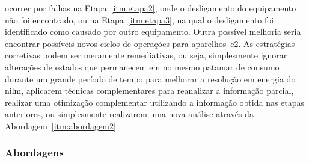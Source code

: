 \begin{enumerate}[label={Etapa} \arabic* - ,ref=\arabic*,align=left]
ocorrer por falhas na Etapa~\ref{itm:etapa2}, onde o desligamento do
equipamento não foi encontrado, ou na Etapa~\ref{itm:etapa3}, na qual
o desligamento foi identificado como causado por outro equipamento.
Outra possível melhoria seria encontrar possíveis novos ciclos de
operações para aparelhos~\gls{c2}. As estratégias corretivas podem ser
meramente remediativas, ou seja, simplesmente ignorar alterações de
estados que permanecem em no mesmo patamar de consumo durante um grande
período de tempo para melhorar a resolução em energia do \gls{nilm},
aplicarem técnicas complementares para reanalizar a informação
parcial, realizar uma otimização complementar utilizando a informação
obtida nas etapas anteriores, ou simplesmente realizarem uma nova
análise através da Abordagem~\ref{itm:abordagem2}.
\end{enumerate}

\subsubsection[Abordagens]{Abordagens \cite[com
adaptações]{nilm_zeifman_review_2011}}
\label{top:abordagens}

